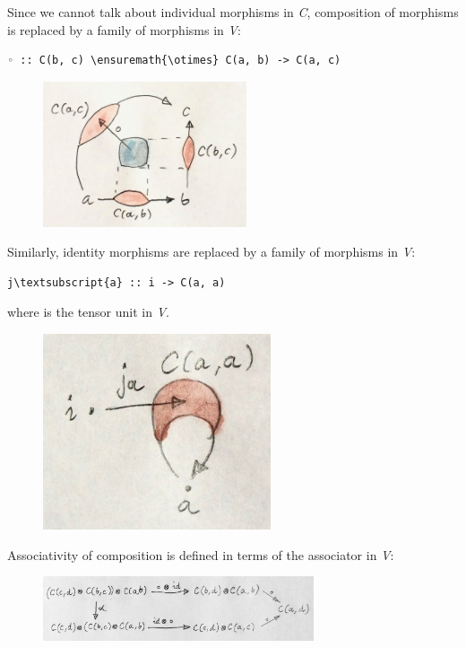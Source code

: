 Since we cannot talk about individual morphisms in \emph{C}, composition
of morphisms is replaced by a family of morphisms in \emph{V}:

\begin{Verbatim}[commandchars=\\\{\}]
◦ :: C(b, c) \ensuremath{\otimes} C(a, b) -> C(a, c)
\end{Verbatim}

\begin{figure}[H]
\centering
\includegraphics[width=60mm]{images/composition.jpg}
\end{figure}

\noindent
Similarly, identity morphisms are replaced by a family of morphisms in
\emph{V}:

\begin{Verbatim}[commandchars=\\\{\}]
j\textsubscript{a} :: i -> C(a, a)
\end{Verbatim}
where  is the tensor unit in \emph{V}.

\begin{figure}[H]
\centering
\includegraphics[width=2.64583in]{images/id.jpg}
\end{figure}

\noindent
Associativity of composition is defined in terms of the associator in
\emph{V}:

\begin{figure}[H]
\centering
\includegraphics[width=80mm]{images/compcoherence.jpg}
\end{figure}

